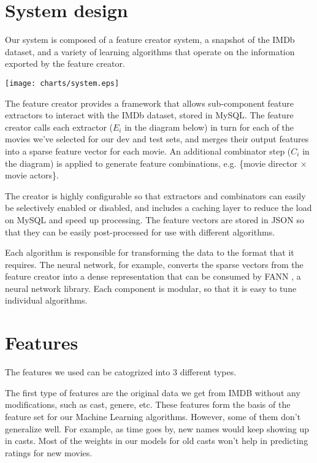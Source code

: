 \documentclass[journal]{IEEEtran}
\begin{document}
\section{System design}
Our system is composed of a feature creator system, a snapshot of the IMDb dataset,
and a variety of learning algorithms that operate on the information exported by
the feature creator.

\begin{center}
    \texttt{[image: charts/system.eps]}
\end{center}

\par The feature creator provides a framework that allows sub-component
feature extractors to interact with the IMDb dataset, stored in MySQL.  The feature
creator calls each extractor ($E_i$ in the diagram below) in turn for each of the movies we've selected for our
dev and test sets, and merges their output features into a sparse feature vector for
each movie.  An additional combinator step ($C_i$ in the diagram) is applied to generate feature
combinations, e.g. \{movie director $\times$ movie actors\}.
\\
\par The creator is highly configurable so that extractors and combinators can easily be selectively enabled or disabled,
and includes a caching layer to reduce the load on MySQL and speed up processing.
The feature vectors are stored in JSON so that they can be easily
post-processed for use with different algorithms.
\\
\par Each algorithm is responsible for transforming the data to the format that it requires.
The neural network, for example, converts the sparse vectors from the feature creator
into a dense representation that can be consumed by FANN \cite{fann}, a neural network library.  Each
component is modular, so that it is easy to tune individual algorithms.


\section{Features}
The features we used can be catogrized into 3 different types.

\par The first type of features are the original data we get from IMDB without any modifications, such as cast, genere, etc. These features form the basis of the feature set for our Machine Learning algorithms. However, some of them don't generalize well. For example, as time goes by, new names would keep showing up in casts. Most of the weights in our models for old casts won't help in predicting ratings for new movies.
\end{document}
